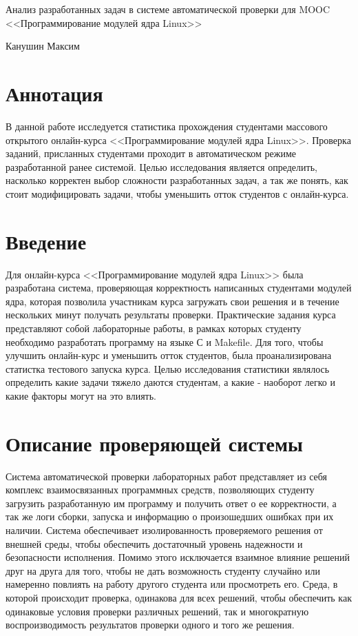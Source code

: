 \documentclass[a4paper,12pt]{article}
\begin{document}
\begin{center}
	\large Анализ разработанных задач в системе автоматической проверки для MOOC <<Программирование модулей ядра Linux>>
	
	\normalsize Канушин Максим
\end{center}

\section{Аннотация}
В данной работе исследуется статистика прохождения студентами массового открытого онлайн-курса <<Программирование модулей ядра Linux>>. Проверка заданий, присланных студентами проходит в автоматическом режиме разработанной ранее системой. Целью исследования является определить, насколько корректен выбор сложности разработанных задач, а так же понять, как стоит модифицировать задачи, чтобы уменьшить отток студентов с онлайн-курса.

\section{Введение}
Для онлайн-курса <<Программирование модулей ядра Linux>>\cite{stepic} была разработана система, проверяющая корректность написанных студентами модулей ядра, которая позволила участникам курса загружать свои решения и в течение нескольких минут получать результаты проверки. Практические задания курса представляют собой лабораторные работы, в рамках которых студенту необходимо разработать программу на языке С\cite{c} и Makefile\cite{makefile}. Для того, чтобы улучшить онлайн-курс и уменьшить отток студентов, была проанализирована статистка тестового запуска курса. Целью исследования статистики являлось определить какие задачи тяжело даются студентам, а какие - наоборот легко и какие факторы могут на это влиять.


\section{Описание проверяющей системы}
Система автоматической проверки лабораторных работ\cite{seim} представляет из себя комплекс взаимосвязанных программных средств, позволяющих студенту загрузить разработанную им программу и получить ответ о ее корректности, а так же логи сборки, запуска и информацию о произошедших ошибках при их наличии. Система обеспечивает изолированность проверяемого решения от внешней среды, чтобы обеспечить достаточный уровень надежности и безопасности исполнения. Помимо этого исключается взаимное влияние решений друг на друга для того, чтобы не дать возможность студенту случайно или намеренно повлиять на работу другого студента или просмотреть его. Среда, в которой происходит проверка, одинакова для всех решений, чтобы обеспечить как одинаковые условия проверки различных решений, так и многократную воспроизводимость результатов проверки одного и того же решения.
\end{document}
